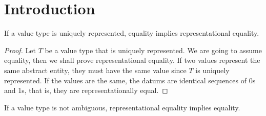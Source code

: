 
\chapter{Introduction}

\begin{lemma}
	If a value type is uniquely represented, equality implies representational equality.
\end{lemma}

\begin{proof}
	Let $T$ be a value type that is uniquely represented. We are going to assume equality,
	then we shall prove representational equality. If two values represent the same abstract entity,
	they must have the same value since $T$ is uniquely represented. If the values are the same, the datums
	are identical sequences of 0s and 1s, that is, they are representationally equal.
\end{proof}

\begin{lemma}
	If a value type is not ambiguous, representational equality implies equality.
\end{lemma}
